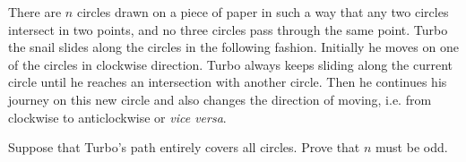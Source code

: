 There are $n$ circles drawn on a piece of paper in such a way that any two circles intersect in two points, and no three circles pass through the same point. Turbo the snail slides along the circles in the following fashion. Initially he moves on one of the circles in clockwise direction. Turbo always keeps sliding along the current circle until he reaches an intersection with another circle. Then he continues his journey on this new circle and also changes the direction of moving, i.e. from clockwise to anticlockwise or \emph{vice versa}.

Suppose that Turbo's path entirely covers all circles. Prove that $n$ must be odd.
